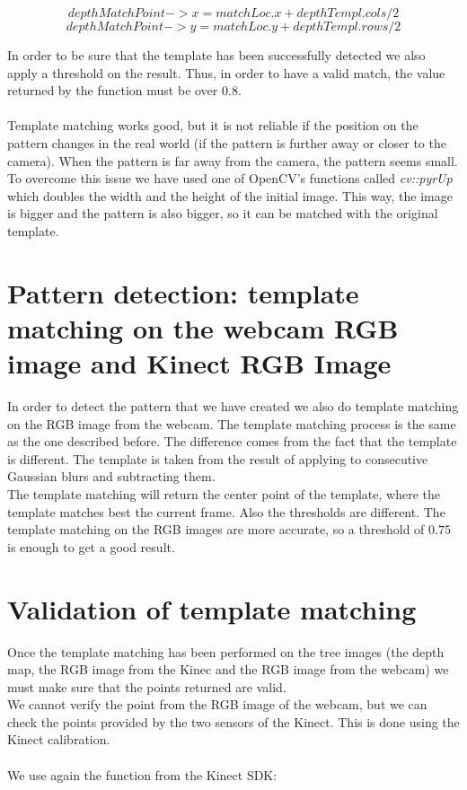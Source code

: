 $$ depthMatchPoint->x = matchLoc.x + depthTempl.cols/2 $$
$$ depthMatchPoint->y = matchLoc.y + depthTempl.rows/2 $$

\noindent
In order to be sure that the template has been successfully detected we also apply a threshold on the result. Thus, in order to have a valid match, the value returned by the function must be over $0.8$. 
\\\\
Template matching works good, but it is not reliable if the position on the pattern changes in the real world (if the pattern is further away or closer to the camera). When the pattern is far away from the camera, the pattern seems small. To overcome this issue we have used one of OpenCV's functions called \emph{cv::pyrUp} which doubles the width and the height of the initial image. This way, the image is bigger and the pattern is also bigger, so it can be matched with the original template. 

\section{Pattern detection: template matching on the webcam RGB image and Kinect RGB Image}
\noindent
In order to detect the pattern that we have created we also do template matching on the RGB image from the webcam. The template matching process is the same as the one described before. The difference comes from the fact that the template is different. The template is taken from the result of applying to consecutive Gaussian blurs and subtracting them. 
\\
The template matching will return the center point of the template, where the template matches best the current frame. Also the thresholds are different. The template matching on the RGB images are more accurate, so a threshold of $0.75$ is enough to get a good result. 

\section{Validation of template matching}
\noindent
Once the template matching has been performed on the tree images (the depth map, the RGB image from the Kinec and the RGB image from the webcam) we must make sure that the points returned are valid. 
\\
We cannot verify the point from the RGB image of the webcam, but we can check the points provided by the two sensors of the Kinect. This is done using the Kinect calibration. 
\\\\
We use again the function from the Kinect SDK:

